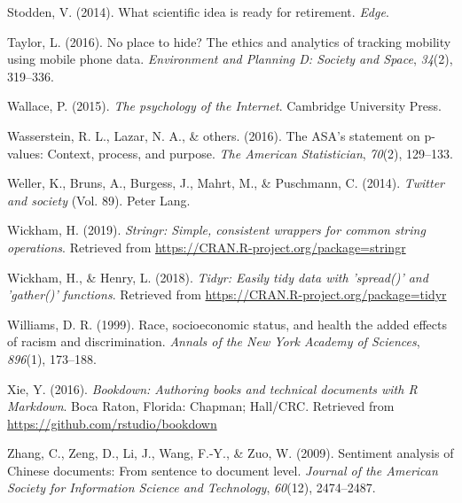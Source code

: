 \documentclass[12pt,twoside]{reedthesis}
\begin{document}
\hypertarget{ref-stodden2014scientific}{}
Stodden, V. (2014). What scientific idea is ready for retirement.
\emph{Edge}.

\hypertarget{ref-taylor2016no}{}
Taylor, L. (2016). No place to hide? The ethics and analytics of
tracking mobility using mobile phone data. \emph{Environment and
Planning D: Society and Space}, \emph{34}(2), 319--336.

\hypertarget{ref-wallace2015psychology}{}
Wallace, P. (2015). \emph{The psychology of the Internet}. Cambridge
University Press.

\hypertarget{ref-wasserstein2016asa}{}
Wasserstein, R. L., Lazar, N. A., \& others. (2016). The ASA's statement
on p-values: Context, process, and purpose. \emph{The American
Statistician}, \emph{70}(2), 129--133.

\hypertarget{ref-weller2014twitter}{}
Weller, K., Bruns, A., Burgess, J., Mahrt, M., \& Puschmann, C. (2014).
\emph{Twitter and society} (Vol. 89). Peter Lang.

\hypertarget{ref-stringrpackage}{}
Wickham, H. (2019). \emph{Stringr: Simple, consistent wrappers for
common string operations}. Retrieved from
\url{https://CRAN.R-project.org/package=stringr}

\hypertarget{ref-tidyrpackage}{}
Wickham, H., \& Henry, L. (2018). \emph{Tidyr: Easily tidy data with
'spread()' and 'gather()' functions}. Retrieved from
\url{https://CRAN.R-project.org/package=tidyr}

\hypertarget{ref-williams1999race}{}
Williams, D. R. (1999). Race, socioeconomic status, and health the added
effects of racism and discrimination. \emph{Annals of the New York
Academy of Sciences}, \emph{896}(1), 173--188.

\hypertarget{ref-bookdown}{}
Xie, Y. (2016). \emph{Bookdown: Authoring books and technical documents
with R Markdown}. Boca Raton, Florida: Chapman; Hall/CRC. Retrieved from
\url{https://github.com/rstudio/bookdown}

\hypertarget{ref-zhang2009sentiment}{}
Zhang, C., Zeng, D., Li, J., Wang, F.-Y., \& Zuo, W. (2009). Sentiment
analysis of Chinese documents: From sentence to document level.
\emph{Journal of the American Society for Information Science and
Technology}, \emph{60}(12), 2474--2487.


\end{document}

